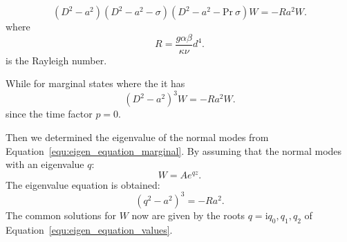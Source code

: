 \begin{equation}
	\left( D^2-a^2 \right)\left( D^2-a^2-\sigma \right)\left( D^2-a^2-\mathrm{Pr}~\sigma \right)W=-Ra^2W.\label{equ:eigen_equation}
\end{equation}
where
\begin{equation}
	R=\frac{g\alpha\beta}{\kappa\nu}d^4.\label{equ:rayleigh}
\end{equation}
is the Rayleigh number.\par
While for marginal states where the  it has
\begin{equation}
	\left( D^2-a^2 \right)^3W=-Ra^2W.\label{equ:eigen_equation_marginal}
\end{equation}
since the time factor \(p=0\).\par
Then we determined the eigenvalue of the normal modes from Equation~\ref{equ:eigen_equation_marginal}. By assuming that the normal modes with an eigenvalue \(q\):
\begin{equation}
W=Ae^{qz}.\label{equ:eigen_mode}
\end{equation}
The eigenvalue equation is obtained:
\begin{equation}
	\left(q^2-a^2\right)^3=-Ra^2.\label{equ:eigen_equation_values}
\end{equation}
The common solutions for \(W\) now are given by the roots \(q=\mathrm{i}q_0,q_1,q_2\) of Equation~\ref{equ:eigen_equation_values}.
